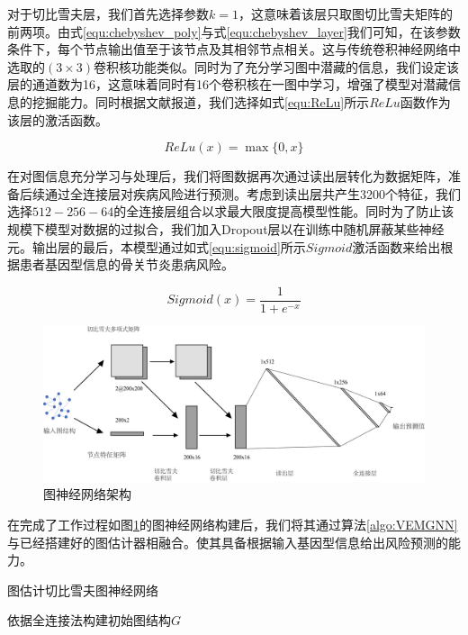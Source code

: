 对于切比雪夫层，我们首先选择参数$k=1$，这意味着该层只取图切比雪夫矩阵的前两项。由式\ref{equ:chebyshev_poly}与式\ref{equ:chebyshev_layer}我们可知，在该参数条件下，每个节点输出值至于该节点及其相邻节点相关。这与传统卷积神经网络中选取的$(3\times 3)$卷积核功能类似。同时为了充分学习图中潜藏的信息，我们设定该层的通道数为16，这意味着同时有16个卷积核在一图中学习，增强了模型对潜藏信息的挖掘能力。同时根据文献报道，我们选择如式\ref{equ:ReLu}所示$ReLu$函数作为该层的激活函数\cite{defferrard_convolutional_2017}。

\begin{equation}\label{equ:ReLu}
    ReLu(x)=\max \{0,x\}
\end{equation}

在对图信息充分学习与处理后，我们将图数据再次通过读出层转化为数据矩阵，准备后续通过全连接层对疾病风险进行预测。考虑到读出层共产生3200个特征，我们选择$512-256-64$的全连接层组合以求最大限度提高模型性能。同时为了防止该规模下模型对数据的过拟合，我们加入Dropout层以在训练中随机屏蔽某些神经元。输出层的最后，本模型通过如式\ref{equ:sigmoid}所示$Sigmoid$激活函数来给出根据患者基因型信息的骨关节炎患病风险。

\begin{equation}\label{equ:sigmoid}
    Sigmoid(x)=\frac{1}{1+e^{-x}}
\end{equation}

\begin{figure}[!ht]
  \centering
  \includegraphics[width=\textwidth]{./figures/Chapter3/GNN.png}
  \caption{图神经网络架构} \label{fig:GNN}
\end{figure}

在完成了工作过程如图\ref{fig:GNN}的图神经网络构建后，我们将其通过算法\ref{algo:VEMGNN}与已经搭建好的图估计器相融合。使其具备根据输入基因型信息给出风险预测的能力。

\begin{algorithm}
\label{algo:VEMGNN}
\SetAlgoLined
\caption{图估计切比雪夫图神经网络}

依据全连接法构建初始图结构$G$

\end{algorithm}



